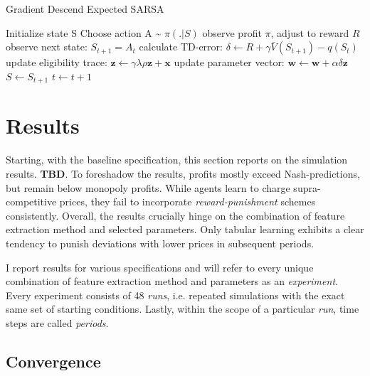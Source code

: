 

\pagebreak
\begin{algorithm}
	\caption{Gradient Descend Expected SARSA}
	\begin{algorithmic}[]
		\small
		\STATE Initialize state S
		\STATE Choose action A \~{} $\pi(.|S)$
		\STATE observe profit $\pi$, adjust to reward $R$
		\STATE observe next state: $S_{t+1} = A_t$
		\STATE calculate TD-error: $\delta \leftarrow R +  \gamma \bar{V}(S_{t+1}) - q(S_t)$
		\STATE update eligibility trace: $\boldsymbol{z} \leftarrow \gamma \lambda \rho \boldsymbol{z} + \boldsymbol{x} $
		\STATE update parameter vector: $\boldsymbol{w} \leftarrow \boldsymbol{w} + \alpha  \delta  \boldsymbol{z}$
		\STATE $S \leftarrow S_{t+1}$
		\STATE $t \leftarrow t+1$
		\ENDWHILE
	\end{algorithmic}
\end{algorithm}
















\section{Results}
Starting, with the baseline specification, this section reports on the simulation results. \textbf{TBD}. To foreshadow the results, profits mostly exceed Nash-predictions, but remain below monopoly profits. While agents learn to charge supra-competitive prices, they fail to incorporate \emph{reward-punishment} schemes consistently. Overall, the results crucially hinge on the combination of feature extraction method and selected parameters. Only tabular learning exhibits a clear tendency to punish deviations with lower prices in subsequent periods.

I report results for various specifications and will refer to every unique combination of feature extraction method and parameters as an \emph{experiment}. Every experiment consists of 48 \emph{runs}, i.e. repeated simulations with the exact same set of starting conditions. Lastly, within the scope of a particular \emph{run}, time steps are called \emph{periods}.

\subsection{Convergence}

